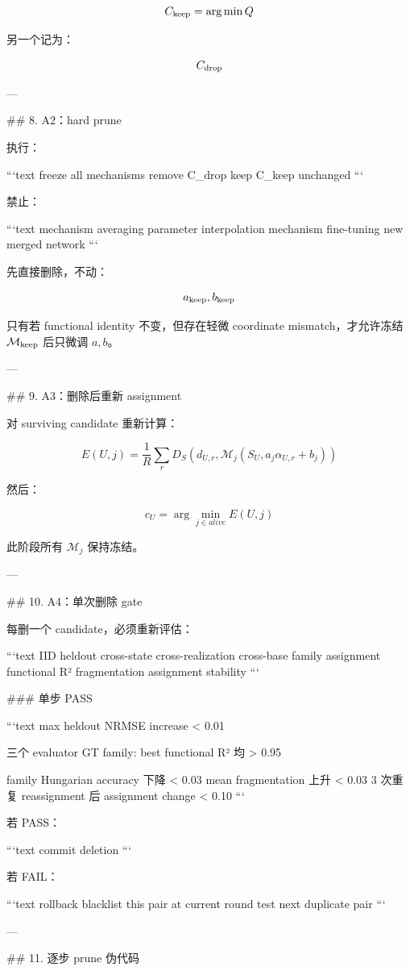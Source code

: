 \[
C_{\rm keep}
=
\arg\min Q
\]

另一个记为：

\[
C_{\rm drop}
\]

---

## 8. A2：hard prune

执行：

```text
freeze all mechanisms
remove C_drop
keep C_keep unchanged
```

禁止：

```text
mechanism averaging
parameter interpolation
mechanism fine-tuning
new merged network
```

先直接删除，不动：

\[
a_{\rm keep},b_{\rm keep}
\]

只有若 functional identity 不变，但存在轻微 coordinate mismatch，才允许冻结 \(\mathcal M_{\rm keep}\) 后只微调 \(a,b\)。

---

## 9. A3：删除后重新 assignment

对 surviving candidate 重新计算：

\[
E(U,j)
=
\frac1R
\sum_r
D_S
\left(
d_{U,r},
\mathcal M_j
\left(
S_U,
a_j\alpha_{U,r}+b_j
\right)
\right)
\]

然后：

\[
c_U=\arg\min_{j\in alive}E(U,j)
\]

此阶段所有 \(\mathcal M_j\) 保持冻结。

---

## 10. A4：单次删除 gate

每删一个 candidate，必须重新评估：

```text
IID heldout
cross-state
cross-realization
cross-base
family assignment
functional R²
fragmentation
assignment stability
```

### 单步 PASS

```text
max heldout NRMSE increase < 0.01

三个 evaluator GT family:
best functional R² 均 > 0.95

family Hungarian accuracy 下降 < 0.03
mean fragmentation 上升 < 0.03
3 次重复 reassignment 后 assignment change < 0.10
```

若 PASS：

```text
commit deletion
```

若 FAIL：

```text
rollback
blacklist this pair at current round
test next duplicate pair
```

---

## 11. 逐步 prune 伪代码

